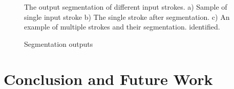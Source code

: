 \documentclass[preprint,10pt,5p,twocolumn]{elsarticle}
\begin{document}
\begin{figure}[]
	\centering
		
	\caption{Segmentation outputs} The output segmentation of different input strokes. a) Sample of single input stroke b) The single stroke after segmentation. c) An example of multiple strokes and their segmentation.   identified.
	\label{fig:SampleSeg}
\end{figure}

\section{Conclusion and Future Work}
\label{ConclusionandFutureWork}
\end{document}
